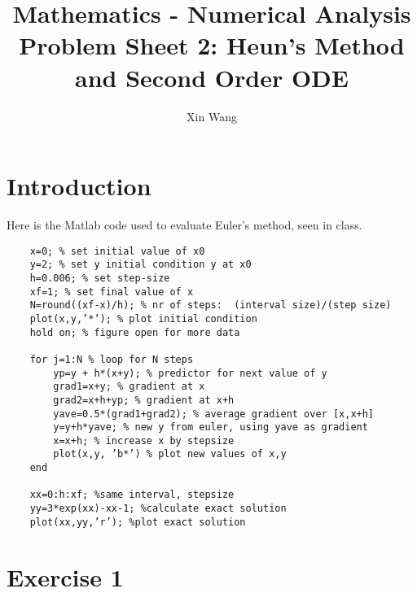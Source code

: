 \documentclass[10pt, a4paper]{article}
\begin{document}
\title{
    Mathematics - Numerical Analysis \\ \large Problem Sheet 2: Heun’s Method and Second Order ODE}
\author{Xin Wang}
\maketitle
\section{Introduction}
Here is the Matlab code used to evaluate Euler’s method, seen in class.
\begin{verbatim}
    x=0; % set initial value of x0
    y=2; % set y initial condition y at x0
    h=0.006; % set step-size
    xf=1; % set final value of x
    N=round((xf-x)/h); % nr of steps:  (interval size)/(step size)
    plot(x,y,’*’); % plot initial condition
    hold on; % figure open for more data

    for j=1:N % loop for N steps
        yp=y + h*(x+y); % predictor for next value of y
        grad1=x+y; % gradient at x
        grad2=x+h+yp; % gradient at x+h
        yave=0.5*(grad1+grad2); % average gradient over [x,x+h]
        y=y+h*yave; % new y from euler, using yave as gradient
        x=x+h; % increase x by stepsize
        plot(x,y, ’b*’) % plot new values of x,y
    end

    xx=0:h:xf; %same interval, stepsize
    yy=3*exp(xx)-xx-1; %calculate exact solution
    plot(xx,yy,’r’); %plot exact solution
\end{verbatim}   
    

\section{Exercise 1}
\end{document}

